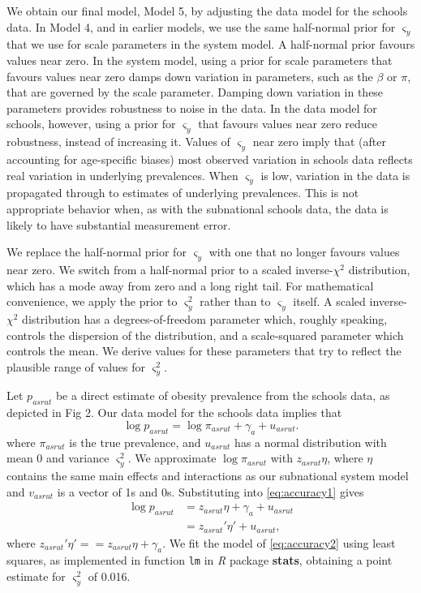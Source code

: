 \documentclass[10pt,letterpaper]{article}
\begin{document}
We obtain our final model, Model 5, by adjusting the data model for the
schools data. In Model 4, and in earlier models, we use the same
half-normal prior for \(\varsigma_y\) that we use for scale parameters
in the system model. A half-normal prior favours values near zero. In
the system model, using a prior for scale parameters that favours values
near zero damps down variation in parameters, such as the \(\beta\) or
\(\pi\), that are governed by the scale parameter. Damping down
variation in these parameters provides robustness to noise in the data.
In the data model for schools, however, using a prior for
\(\varsigma_y\) that favours values near zero reduce robustness, instead
of increasing it. Values of \(\varsigma_y\) near zero imply that (after
accounting for age-specific biases) most observed variation in schools
data reflects real variation in underlying prevalences. When
\(\varsigma_y\) is low, variation in the data is propagated through to
estimates of underlying prevalences. This is not appropriate behavior
when, as with the subnational schools data, the data is likely to have
substantial measurement error.

We replace the half-normal prior for \(\varsigma_y\) with one that no
longer favours values near zero. We switch from a half-normal prior to a
scaled inverse-\(\chi^2\) distribution, which has a mode away from zero
and a long right tail. For mathematical convenience, we apply the prior
to \(\varsigma_y^2\) rather than to \(\varsigma_y\) itself. A scaled
inverse-\(\chi^2\) distribution has a degrees-of-freedom parameter
which, roughly speaking, controls the dispersion of the distribution,
and a scale-squared parameter which controls the mean. We derive values
for these parameters that try to reflect the plausible range of values
for \(\varsigma_y^2\).

Let \(p_{asrut}\) be a direct estimate of obesity prevalence from the
schools data, as depicted in Fig 2. Our data model for the schools data
implies that \begin{equation}
  \log p_{asrut} = \log \pi_{asrut} + \gamma_a + u_{asrut}. \label{eq:accuracy1}
\end{equation} where \(\pi_{asrut}\) is the true prevalence, and
\(u_{asrut}\) has a normal distribution with mean 0 and variance
\(\varsigma_y^2\). We approximate \(\log \pi_{asrut}\) with
\(z_{asrut} \eta\), where \(\eta\) contains the same main effects and
interactions as our subnational system model and \(v_{asrut}\) is a
vector of 1s and 0s. Substituting into \eqref{eq:accuracy1} gives
\begin{align}
  \log p_{asrut} & = z_{asrut} \eta + \gamma_a + u_{asrut} \\
  & = z_{asrut}' \eta' + u_{asrut}, \label{eq:accuracy2}
\end{align} where \(z_{asrut}' \eta' = = z_{asrut} \eta + \gamma_a\). We
fit the model of \eqref{eq:accuracy2} using least squares, as
implemented in function \texttt{lm} in \emph{R} package \textbf{stats},
obtaining a point estimate for \(\varsigma_y^2\) of 0.016.
\end{document}
